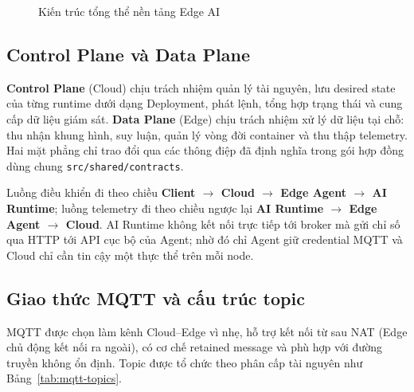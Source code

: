 \begin{figure}[H]
{}
\caption{Kiến trúc tổng thể nền tảng Edge AI}
\label{fig:platform-architecture}
\end{figure}

\subsection{Control Plane và Data Plane}

\textbf{Control Plane} (Cloud) chịu trách nhiệm quản lý tài nguyên, lưu desired
state của từng runtime dưới dạng Deployment, phát lệnh, tổng hợp trạng thái và
cung cấp dữ liệu giám sát. \textbf{Data Plane} (Edge) chịu trách nhiệm xử lý dữ
liệu tại chỗ: thu nhận khung hình, suy luận, quản lý vòng đời container và thu
thập telemetry. Hai mặt phẳng chỉ trao đổi qua các thông điệp đã định nghĩa trong
gói hợp đồng dùng chung \texttt{src/shared/contracts}.

Luồng điều khiển đi theo chiều \textbf{Client $\rightarrow$ Cloud $\rightarrow$
Edge Agent $\rightarrow$ AI Runtime}; luồng telemetry đi theo chiều ngược lại
\textbf{AI Runtime $\rightarrow$ Edge Agent $\rightarrow$ Cloud}. AI Runtime không
kết nối trực tiếp tới broker mà gửi chỉ số qua HTTP tới API cục bộ của Agent; nhờ
đó chỉ Agent giữ credential MQTT và Cloud chỉ cần tin cậy một thực thể trên mỗi node.

\subsection{Giao thức MQTT và cấu trúc topic}

MQTT \cite{mqtt5} được chọn làm kênh Cloud--Edge vì nhẹ, hỗ trợ kết nối từ sau
NAT (Edge chủ động kết nối ra ngoài), có cơ chế retained message và phù hợp với
đường truyền không ổn định. Topic được tổ chức theo phân cấp tài nguyên như
Bảng~\ref{tab:mqtt-topics}.

